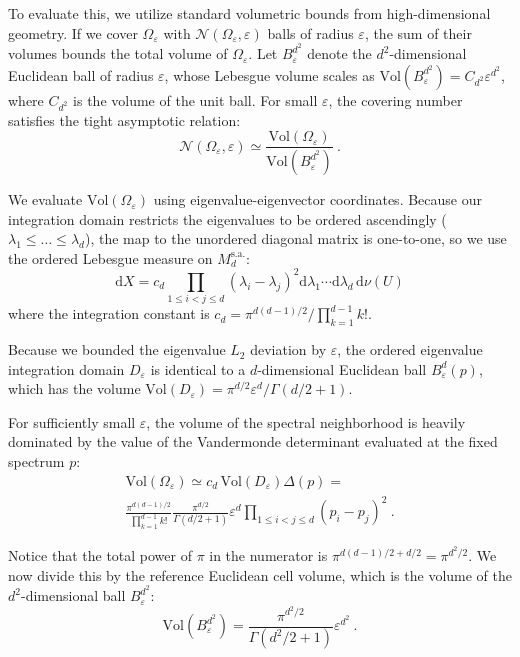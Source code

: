 \documentclass[aps,pre,twocolumn,superscriptaddress,amsmath,amssymb,reprint]{revtex4-2}
\newcommand{\dd}{\mathrm{d}}
\def\eps{\varepsilon}
\begin{document}
To evaluate this, we utilize standard volumetric bounds from high-dimensional geometry. If we cover $\Omega_\eps$ with $\mathcal{N}(\Omega_\eps, \eps)$ balls of radius $\eps$, the sum of their volumes bounds the total volume of $\Omega_\eps$. Let $B_\eps^{d^2}$ denote the $d^2$-dimensional Euclidean ball of radius $\eps$, whose Lebesgue volume scales as $\mathrm{Vol}(B_\eps^{d^2}) = C_{d^2} \eps^{d^2}$, where $C_{d^2}$ is the volume of the unit ball. For small $\eps$, the covering number satisfies the tight asymptotic relation:
\begin{equation}
    \mathcal{N}(\Omega_\eps, \eps) \simeq \frac{\mathrm{Vol}(\Omega_\eps)}{\mathrm{Vol}(B_\eps^{d^2})}\ .
\end{equation}

We evaluate $\mathrm{Vol}(\Omega_\eps)$ using eigenvalue-eigenvector coordinates. Because our integration domain restricts the eigenvalues to be ordered ascendingly ($\lambda_1 \le \dots \le \lambda_d$), the map to the unordered diagonal matrix is one-to-one, so we use the ordered Lebesgue measure on $M_d^\mathrm{s.a.}$:
\begin{equation}
    \dd X = c_d\prod_{1\le i<j\le d}(\lambda_i-\lambda_j)^2\dd\lambda_1\cdots\dd\lambda_d \,\dd\nu(U)
\end{equation}
where the integration constant is $c_d =\pi^{d(d-1)/2}/\prod_{k=1}^{d-1} k!$. 

Because we bounded the eigenvalue $L_2$ deviation by $\eps$, the ordered eigenvalue integration domain $D_\eps$ is identical to a $d$-dimensional Euclidean ball $B_\eps^d(p)$, which has the volume $\mathrm{Vol}(D_\eps) = \pi^{d/2}\eps^d/\Gamma(d/2 + 1) $. 

For sufficiently small $\eps$, the volume of the spectral neighborhood is heavily dominated by the value of the Vandermonde determinant evaluated at the fixed spectrum $p$:
\begin{multline}
    \mathrm{Vol}(\Omega_\eps) \simeq c_d \, \mathrm{Vol}(D_\eps) \Delta(p) = \\\frac{\pi^{d(d-1)/2}}{\prod_{k=1}^{d-1} k!} \frac{\pi^{d/2}}{\Gamma(d/2 + 1)} \eps^d \prod_{1\le i<j\le d}(p_i-p_j)^2\ .
\end{multline}

Notice that the total power of $\pi$ in the numerator is $\pi^{d(d-1)/2 + d/2} = \pi^{d^2/2}$. We now divide this by the reference Euclidean cell volume, which is the volume of the $d^2$-dimensional ball $B_\eps^{d^2}$:
\begin{equation}
    \mathrm{Vol}(B_\eps^{d^2}) = \frac{\pi^{d^2/2}}{\Gamma(d^2/2 + 1)} \eps^{d^2}\ .
\end{equation}
\end{document}
